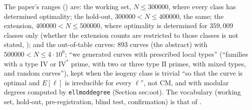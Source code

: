 \begin{sloppypar}
\begin{remark}\label{rem:computation:protocol}
The paper's ranges () are: the working set, $N\le300000$, where every class has determined optimality; the
hold-out, $300000<N\le400000$, the same; the extension, $400000<N\le500000$, where optimality is determined for $359{,}009$ classes only (whether the
extension counts are restricted to those classes is not stated, ); and the out-of-table curves: $893$ curves (the abstract)
with $500000<N\le4\cdot10^6$; ``we generated curves with prescribed local types'' (``families with a type $\mathrm{IV}$ or $\mathrm{IV}^*$ prime, with two
or three type $\mathrm{II}$ primes, with mixed types, and random curves''), kept when the isogeny class is trivial ``so that the curve is optimal and
$E[\ell]$ is irreducible for every $\ell$'', not CM, and with modular degrees computed by \texttt{ellmoddegree} (Section sec:oot). The vocabulary
(working set, hold-out, pre-registration, blind test, confirmation) is that of .
\end{remark}


\end{sloppypar}
